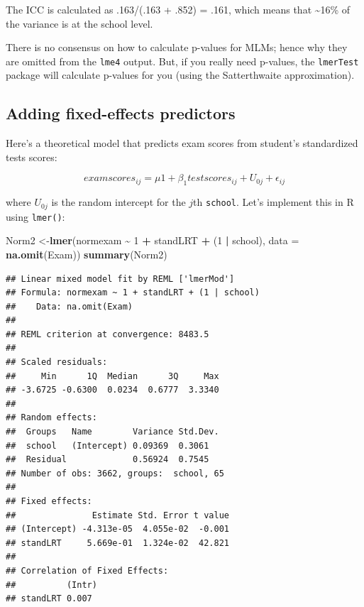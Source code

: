 \documentclass[
]{book}
\newenvironment{Shaded}{\begin{snugshade}}{\end{snugshade}}
\newcommand{\DataTypeTok}[1]{\textcolor[rgb]{0.13,0.29,0.53}{#1}}
\newcommand{\DecValTok}[1]{\textcolor[rgb]{0.00,0.00,0.81}{#1}}
\newcommand{\KeywordTok}[1]{\textcolor[rgb]{0.13,0.29,0.53}{\textbf{#1}}}
\newcommand{\NormalTok}[1]{#1}
\newcommand{\OperatorTok}[1]{\textcolor[rgb]{0.81,0.36,0.00}{\textbf{#1}}}
\newcommand{\StringTok}[1]{\textcolor[rgb]{0.31,0.60,0.02}{#1}}
\begin{document}
The ICC is calculated as .163/(.163 + .852) = .161, which means that \textasciitilde16\% of the variance is at the school level.

There is no consensus on how to calculate p-values for MLMs; hence why they are omitted from the \texttt{lme4} output. But, if you really need p-values, the \texttt{lmerTest} package will calculate p-values for you (using the Satterthwaite approximation).

\hypertarget{adding-fixed-effects-predictors}{%
\subsection{Adding fixed-effects predictors}\label{adding-fixed-effects-predictors}}

Here's a theoretical model that predicts exam scores from student's standardized tests scores:

\begin{alert}

\[
examscores_{ij} = \mu1 + \beta_1testscores_{ij} + U_{0j} + \epsilon_{ij}
\]

\end{alert}

where \(U_{0j}\) is the random intercept for the \(j\)th \texttt{school}. Let's implement this in R using \texttt{lmer()}:

\begin{Shaded}
\begin{Highlighting}[]
\NormalTok{  Norm2 \textless{}{-}}\KeywordTok{lmer}\NormalTok{(normexam }\OperatorTok{\textasciitilde{}}\StringTok{ }\DecValTok{1} \OperatorTok{+}\StringTok{ }\NormalTok{standLRT }\OperatorTok{+}\StringTok{ }\NormalTok{(}\DecValTok{1} \OperatorTok{|}\StringTok{ }\NormalTok{school),}
               \DataTypeTok{data =} \KeywordTok{na.omit}\NormalTok{(Exam)) }
  \KeywordTok{summary}\NormalTok{(Norm2) }
\end{Highlighting}
\end{Shaded}

\begin{verbatim}
## Linear mixed model fit by REML ['lmerMod']
## Formula: normexam ~ 1 + standLRT + (1 | school)
##    Data: na.omit(Exam)
## 
## REML criterion at convergence: 8483.5
## 
## Scaled residuals: 
##     Min      1Q  Median      3Q     Max 
## -3.6725 -0.6300  0.0234  0.6777  3.3340 
## 
## Random effects:
##  Groups   Name        Variance Std.Dev.
##  school   (Intercept) 0.09369  0.3061  
##  Residual             0.56924  0.7545  
## Number of obs: 3662, groups:  school, 65
## 
## Fixed effects:
##               Estimate Std. Error t value
## (Intercept) -4.313e-05  4.055e-02  -0.001
## standLRT     5.669e-01  1.324e-02  42.821
## 
## Correlation of Fixed Effects:
##          (Intr)
## standLRT 0.007
\end{verbatim}
\end{document}
